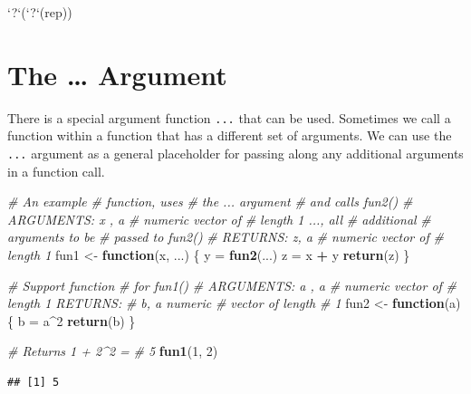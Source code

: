 \documentclass[
]{book}
\newenvironment{Shaded}{\begin{snugshade}}{\end{snugshade}}
\newcommand{\CommentTok}[1]{\textcolor[rgb]{0.56,0.35,0.01}{\textit{#1}}}
\newcommand{\ControlFlowTok}[1]{\textcolor[rgb]{0.13,0.29,0.53}{\textbf{#1}}}
\newcommand{\DataTypeTok}[1]{\textcolor[rgb]{0.13,0.29,0.53}{#1}}
\newcommand{\DecValTok}[1]{\textcolor[rgb]{0.00,0.00,0.81}{#1}}
\newcommand{\KeywordTok}[1]{\textcolor[rgb]{0.13,0.29,0.53}{\textbf{#1}}}
\newcommand{\NormalTok}[1]{#1}
\newcommand{\OperatorTok}[1]{\textcolor[rgb]{0.81,0.36,0.00}{\textbf{#1}}}
\newcommand{\StringTok}[1]{\textcolor[rgb]{0.31,0.60,0.02}{#1}}
\begin{document}
\begin{Shaded}
\begin{Highlighting}[]
\StringTok{`}\DataTypeTok{?}\StringTok{`}\NormalTok{(}\StringTok{`}\DataTypeTok{?}\StringTok{`}\NormalTok{(rep))}
\end{Highlighting}
\end{Shaded}

\hypertarget{the-argument}{%
\section{The \ldots{} Argument}\label{the-argument}}

There is a special argument function \texttt{...} that can be used. Sometimes we call a function within a function that has a different set of arguments. We can use the \texttt{...} argument as a general placeholder for passing along any additional arguments in a function call.

\begin{Shaded}
\begin{Highlighting}[]
\CommentTok{# An example}
\CommentTok{# function, uses}
\CommentTok{# the ... argument}
\CommentTok{# and calls fun2()}
\CommentTok{# ARGUMENTS: x , a}
\CommentTok{# numeric vector of}
\CommentTok{# length 1 ..., all}
\CommentTok{# additional}
\CommentTok{# arguments to be}
\CommentTok{# passed to fun2()}
\CommentTok{# RETURNS: z, a}
\CommentTok{# numeric vector of}
\CommentTok{# length 1}
\NormalTok{fun1 <-}\StringTok{ }\ControlFlowTok{function}\NormalTok{(x, ...) \{}
\NormalTok{    y =}\StringTok{ }\KeywordTok{fun2}\NormalTok{(...)}
\NormalTok{    z =}\StringTok{ }\NormalTok{x }\OperatorTok{+}\StringTok{ }\NormalTok{y}
    \KeywordTok{return}\NormalTok{(z)}
\NormalTok{\}}

\CommentTok{# Support function}
\CommentTok{# for fun1()}
\CommentTok{# ARGUMENTS: a , a}
\CommentTok{# numeric vector of}
\CommentTok{# length 1 RETURNS:}
\CommentTok{# b, a numeric}
\CommentTok{# vector of length}
\CommentTok{# 1}
\NormalTok{fun2 <-}\StringTok{ }\ControlFlowTok{function}\NormalTok{(a) \{}
\NormalTok{    b =}\StringTok{ }\NormalTok{a}\OperatorTok{^}\DecValTok{2}
    \KeywordTok{return}\NormalTok{(b)}
\NormalTok{\}}

\CommentTok{# Returns 1 + 2^2 =}
\CommentTok{# 5}
\KeywordTok{fun1}\NormalTok{(}\DecValTok{1}\NormalTok{, }\DecValTok{2}\NormalTok{)}
\end{Highlighting}
\end{Shaded}

\begin{verbatim}
## [1] 5
\end{verbatim}
\end{document}
